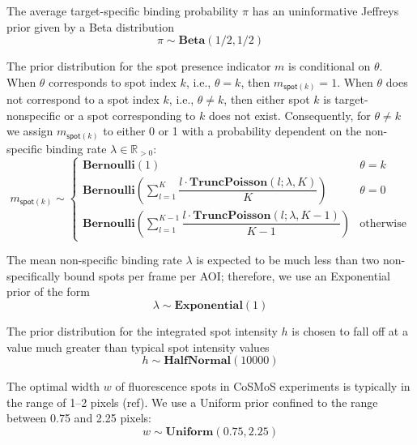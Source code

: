 The average target-specific binding probability $\pi$ has an uninformative Jeffreys prior given by a Beta distribution
%
\begin{equation}
    \pi \sim \mathbf{Beta}(1/2, 1/2)
\end{equation}

The prior distribution for the spot presence indicator $m$ is conditional on $\theta$. When $\theta$ corresponds to spot index $k$, i.e., $\theta = k$, then $m_{\mathsf{spot}(k)} = 1$. When $\theta$ does not correspond to a spot index $k$, i.e., $\theta \neq k$, then either spot $k$ is target-nonspecific or a spot corresponding to $k$ does not exist. Consequently, for $\theta \neq k$ we assign $m_{\mathsf{spot}(k)}$ to either 0 or 1 with a probability dependent on the non-specific binding rate $\lambda \in \mathbb{R}_{>0}$:
%
\begin{equation}
    m_{\mathsf{spot}(k)} \sim
    \begin{cases}
        \mathbf{Bernoulli}(1) & \text{$\theta = k$} \\
        \mathbf{Bernoulli} \left( \sum_{l=1}^K \dfrac{l \cdot \mathbf{TruncPoisson}(l; \lambda, K)}{K} \right) & \text{$\theta = 0$} \\
        \mathbf{Bernoulli} \left( \sum_{l=1}^{K-1} \dfrac{l \cdot \mathbf{TruncPoisson}(l; \lambda, K-1)}{K-1} \right) & \text{otherwise}
    \end{cases}
\end{equation}

The mean non-specific binding rate $\lambda$ is expected to be much less than two non-specifically bound spots per frame per AOI; therefore, we use an Exponential prior of the form
%
\begin{equation}
    \lambda \sim \mathbf{Exponential}(1)
\end{equation}

The prior distribution for the integrated spot intensity $h$ is chosen to fall off at a value much greater than typical spot intensity values 
%
\begin{equation}
    h \sim \mathbf{HalfNormal}(10000)
\end{equation}

The optimal width $w$ of fluorescence spots in CoSMoS experiments is typically in the range of 1--2 pixels (ref). We use a Uniform prior confined to the range between 0.75 and 2.25 pixels:
%
\begin{equation}
    w \sim \mathbf{Uniform}(0.75, 2.25)
\end{equation}

